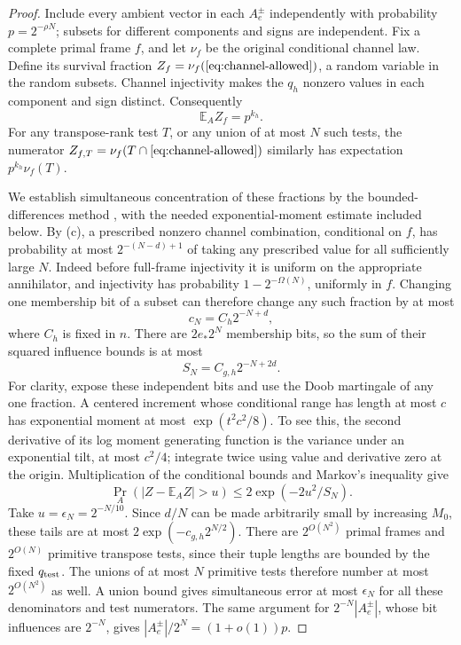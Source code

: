 \begin{proof}
Include every ambient vector in each \(A_e^\pm\) independently with
probability \(p=2^{-\rho N}\); subsets for different components and signs
are independent.  Fix a complete primal frame \(f\), and let \(\nu_f\)
be the original conditional channel law.  Define its survival fraction
\(Z_f=\nu_f(\text{\Cref{eq:channel-allowed}})\), a random variable in the
random subsets.  Channel injectivity makes the \(q_h\) nonzero values in
each component and sign distinct.  Consequently
\[
 \mathbb E_A Z_f=p^{k_h}.
\]
For any transpose-rank test \(T\), or any union of at most \(N\)
such tests, the numerator
\(Z_{f,T}=\nu_f(T\cap\text{\Cref{eq:channel-allowed}})\) similarly has
expectation \(p^{k_h}\nu_f(T)\).

We establish simultaneous concentration of these fractions by the
bounded-differences method \citep{azuma1967,mcdiarmid1989}, with the
needed exponential-moment estimate included below.  By
(c), a prescribed nonzero channel combination,
conditional on \(f\), has probability at most \(2^{-(N-d)+1}\) of taking
any prescribed value for all sufficiently large \(N\).  Indeed before
full-frame injectivity it is uniform on the appropriate annihilator,
and injectivity has probability \(1-2^{-\Omega(N)}\), uniformly in \(f\).
Changing one membership bit of a subset can therefore change any such
fraction by at most
\[
 c_N=C_h2^{-N+d},
\]
where \(C_h\) is fixed in \(n\).  There are \(2e_*2^N\) membership bits,
so the sum of their squared influence bounds is at most
\[
 S_N=C_{g,h}2^{-N+2d}.
\]
For clarity, expose these independent bits and use the Doob martingale
of any one fraction.  A centered increment whose conditional range has
length at most \(c\) has exponential moment at most \(\exp(t^2c^2/8)\).
To see this, the second derivative of its log moment generating function
is the variance under an exponential tilt, at most \(c^2/4\); integrate
twice using value and derivative zero at the origin.  Multiplication of
the conditional bounds and Markov's inequality give
\[
 \Pr_A(|Z-\mathbb E_AZ|>u)\le2\exp(-2u^2/S_N).
\]
Take \(u=\epsilon_N=2^{-N/10}\).  Since \(d/N\) can be made arbitrarily
small by increasing \(M_0\), these tails are at most
\(2\exp(-c_{g,h}2^{N/2})\).  There are \(2^{O(N^2)}\) primal frames and \(2^{O(N)}\) primitive
transpose tests, since their tuple lengths are bounded by the fixed
\(q_{\rm test}\).  The unions of at most \(N\) primitive tests therefore
number at most \(2^{O(N^2)}\) as well.  A union bound gives simultaneous
error at most \(\epsilon_N\) for all these denominators and test numerators.
The same argument for \(2^{-N}|A_e^\pm|\), whose bit influences are
\(2^{-N}\), gives \(|A_e^\pm|/2^N=(1+o(1))p\).


\end{proof}
